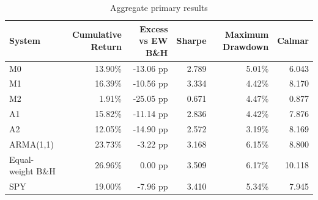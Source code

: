 \begin{table}[htbp]
\centering
\small
\caption{Aggregate primary results}
\label{tab:aggregate-primary}
\begin{tabular}{lrrrrr}
\toprule
System & Cumulative Return & Excess vs EW B\&H & Sharpe & Maximum Drawdown & Calmar \\
\midrule
M0 & 13.90\% & -13.06 pp & 2.789 & 5.01\% & 6.043 \\
M1 & 16.39\% & -10.56 pp & 3.334 & 4.42\% & 8.170 \\
M2 & 1.91\% & -25.05 pp & 0.671 & 4.47\% & 0.877 \\
A1 & 15.82\% & -11.14 pp & 2.836 & 4.42\% & 7.876 \\
A2 & 12.05\% & -14.90 pp & 2.572 & 3.19\% & 8.169 \\
ARMA(1,1) & 23.73\% & -3.22 pp & 3.168 & 6.15\% & 8.800 \\
Equal-weight B\&H & 26.96\% & 0.00 pp & 3.509 & 6.17\% & 10.118 \\
SPY & 19.00\% & -7.96 pp & 3.410 & 5.34\% & 7.945 \\
\bottomrule
\end{tabular}
\end{table}
